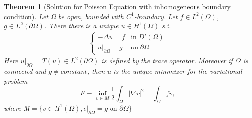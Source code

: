 \documentclass{report}
\theoremstyle{tommy}
\newtheorem{thm}[defn]{Theorem}
\begin{document}
  \begin{thm}[Solution for Poisson Equation with inhomogeneous boundary condition]\label{Solution for Poisson Equation with inhomogeneous boundary condition}
    Let \(\Omega\) be open, bounded with \(C^1\)-boundary. Let \(f \in L^2(\Omega)\), \(g \in L^2(\partial \Omega)\). There there is a unique \(u \in H^1(\Omega)\) s.t. 
    \begin{align*}
      \begin{cases}
        - \Delta u = f &\text{in } D'(\Omega) \\ u|_{\partial \Omega} = g &\text{on } \partial \Omega
      \end{cases}
    \end{align*}
    Here \(u|_{\partial \Omega} = T(u) \in L^2(\partial \Omega)\) is defined by the trace operator. Moreover if \(\Omega\) is connected and \(g \ne constant\), then \(u\) is the unique minimizer for the variational problem
    \[E = \inf_{v \in M} \frac{1}{2} \int_\Omega |\nabla v|^2 - \int_\Omega f v,\]
    where \(M = \{v \in H^1(\Omega), v|_{\partial \Omega} = g \text{ on }\partial \Omega\}\)
  \end{thm}
\end{document}
